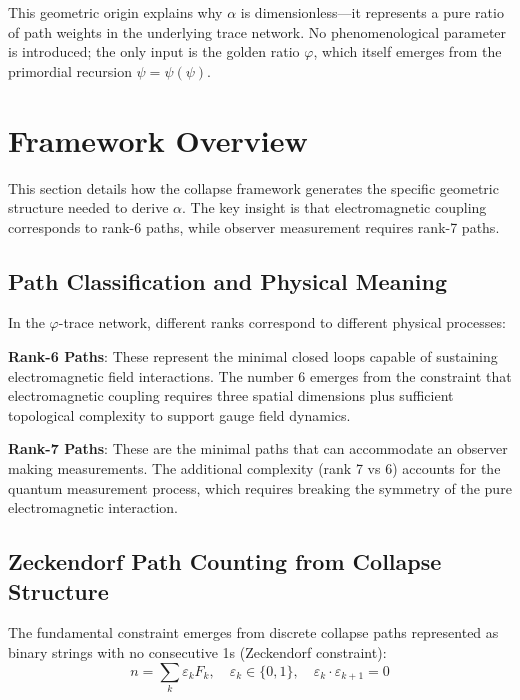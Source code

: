 \documentclass[%
 reprint,
 amsmath,amssymb,
 aps,
 prd,
 10pt,
 nofootinbib,      %
 longbibliography  %
]{revtex4-2}
\theoremstyle{definition}
\theoremstyle{remark}
\begin{document}
This geometric origin explains why $\alpha$ is dimensionless—it represents a pure ratio of path weights in the underlying trace network. 
No phenomenological parameter is introduced; the only input is the golden ratio $\varphi$, which itself emerges from the primordial recursion $\psi = \psi(\psi)$.

\section{Framework Overview}\label{sec:framework}

This section details how the collapse framework generates the specific geometric structure needed to derive $\alpha$. The key insight is that electromagnetic coupling corresponds to rank-6 paths, while observer measurement requires rank-7 paths.

\subsection{Path Classification and Physical Meaning}

In the $\varphi$-trace network, different ranks correspond to different physical processes:

\textbf{Rank-6 Paths}: These represent the minimal closed loops capable of sustaining electromagnetic field interactions. The number 6 emerges from the constraint that electromagnetic coupling requires three spatial dimensions plus sufficient topological complexity to support gauge field dynamics.

\textbf{Rank-7 Paths}: These are the minimal paths that can accommodate an observer making measurements. The additional complexity (rank 7 vs 6) accounts for the quantum measurement process, which requires breaking the symmetry of the pure electromagnetic interaction.

\subsection{Zeckendorf Path Counting from Collapse Structure}

The fundamental constraint emerges from discrete collapse paths represented as binary strings with no consecutive 1s (Zeckendorf constraint):
\begin{equation}
  n = \sum_k \varepsilon_k F_k, \quad \varepsilon_k \in \{0,1\}, \quad \varepsilon_k \cdot \varepsilon_{k+1} = 0
\end{equation}
\end{document}
